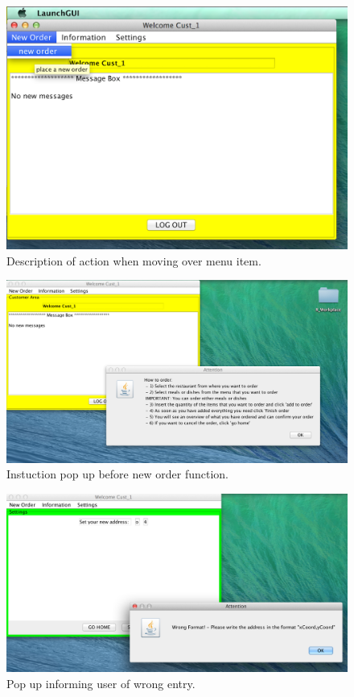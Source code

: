 \begin{figure}
  \begin{center}
    \includegraphics[scale=0.57]{./img/menuBarDescription.png}
    \end{center}
  \caption{Description of action when moving over menu item.}
  \label{fig:menuBarDescription}
\end{figure}
\begin{figure}
  \begin{center}
    \includegraphics[scale=0.37]{./img/instructionPopUp.png}
    \end{center}
  \caption{Instuction pop up before new order function.}
  \label{fig:instructionPopUp}
\end{figure}
\begin{figure}
  \begin{center}
    \includegraphics[scale=0.37]{./img/wrongFormat.png}
    \end{center}
  \caption{Pop up informing user of wrong entry.}
  \label{fig:wrongFormat}
\end{figure}


